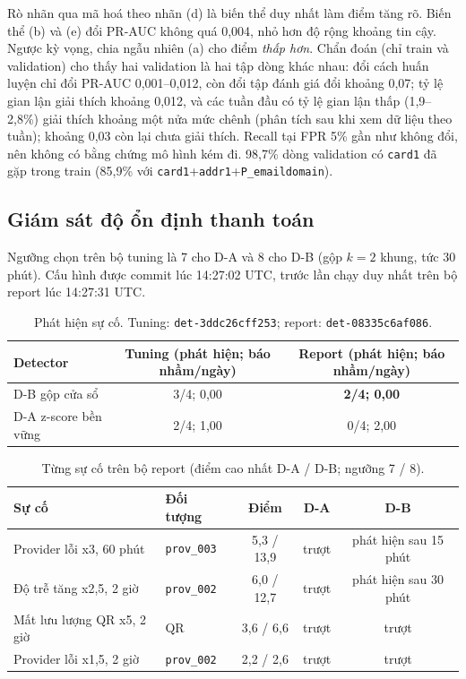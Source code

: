 \documentclass[11pt,a4paper]{article}
\theoremstyle{definition}
\theoremstyle{remark}
\newcommand{\code}[1]{\texttt{#1}}
\numberwithin{equation}{section}
\begin{document}
Rò nhãn qua mã hoá theo nhãn (d) là biến thể duy nhất làm điểm tăng rõ. Biến thể (b) và (e) đổi PR-AUC không quá 0,004, nhỏ hơn độ rộng khoảng tin cậy. Ngược kỳ vọng, chia ngẫu nhiên (a) cho điểm \emph{thấp hơn}. Chẩn đoán (chỉ train và validation) cho thấy hai validation là hai tập dòng khác nhau: đổi cách huấn luyện chỉ đổi PR-AUC 0,001--0,012, còn đổi tập đánh giá đổi khoảng 0,07; tỷ lệ gian lận giải thích khoảng 0,012, và các tuần đầu có tỷ lệ gian lận thấp (1,9--2,8\%) giải thích khoảng một nửa mức chênh (phân tích sau khi xem dữ liệu theo tuần); khoảng 0,03 còn lại chưa giải thích. Recall tại FPR 5\% gần như không đổi, nên không có bằng chứng mô hình kém đi. 98,7\% dòng validation có \code{card1} đã gặp trong train (85,9\% với \code{card1}+\code{addr1}+\code{P\_emaildomain}).

\subsection{Giám sát độ ổn định thanh toán}\label{sec:res-rel}
Ngưỡng chọn trên bộ tuning là 7 cho D-A và 8 cho D-B (gộp $k=2$ khung, tức 30 phút). Cấu hình được commit lúc 14:27:02 UTC, trước lần chạy duy nhất trên bộ report lúc 14:27:31 UTC.

\begin{table}[H]\centering
\caption{Phát hiện sự cố. Tuning: \code{det-3ddc26cff253}; report: \code{det-08335c6af086}.}\label{tab:det}
\begin{tabular}{@{}lcc@{}}
\toprule
Detector & Tuning (phát hiện; báo nhầm/ngày) & Report (phát hiện; báo nhầm/ngày) \\ \midrule
D-B gộp cửa sổ & 3/4; 0,00 & \textbf{2/4; 0,00} \\
D-A z-score bền vững & 2/4; 1,00 & 0/4; 2,00 \\ \bottomrule
\end{tabular}
\end{table}

\begin{table}[H]\centering
\caption{Từng sự cố trên bộ report (điểm cao nhất D-A / D-B; ngưỡng 7 / 8).}\label{tab:det-each}
\begin{tabular}{@{}llccc@{}}
\toprule
Sự cố & Đối tượng & Điểm & D-A & D-B \\ \midrule
Provider lỗi x3, 60 phút & \code{prov\_003} & 5,3 / 13,9 & trượt & phát hiện sau 15 phút \\
Độ trễ tăng x2,5, 2 giờ & \code{prov\_002} & 6,0 / 12,7 & trượt & phát hiện sau 30 phút \\
Mất lưu lượng QR x5, 2 giờ & QR & 3,6 / 6,6 & trượt & trượt \\
Provider lỗi x1,5, 2 giờ & \code{prov\_002} & 2,2 / 2,6 & trượt & trượt \\ \bottomrule
\end{tabular}
\end{table}
\end{document}
